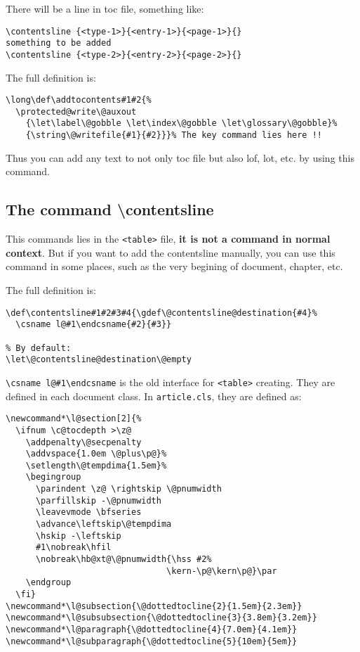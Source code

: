 \documentclass{article}
\begin{document}
There will be a line in toc file, something like:
\begin{lstlisting}
\contentsline {<type-1>}{<entry-1>}{<page-1>}{}
something to be added
\contentsline {<type-2>}{<entry-2>}{<page-2>}{}
\end{lstlisting}

The full definition is:
\begin{lstlisting}
\long\def\addtocontents#1#2{%
  \protected@write\@auxout
    {\let\label\@gobble \let\index\@gobble \let\glossary\@gobble}%
    {\string\@writefile{#1}{#2}}}% The key command lies here !!
\end{lstlisting}

Thus you can add any text to not only toc file but also lof, lot, etc. by using this command.

\subsection{The command \textbackslash contentsline}
This commands lies in the \verb|<table>| file, \textbf{it is not a command in normal context}. But if you want to add the 
contentsline manually, you can use this command in some places, such as the very begining of document, chapter, etc. 

The full definition is:
\begin{lstlisting}
\def\contentsline#1#2#3#4{\gdef\@contentsline@destination{#4}%
  \csname l@#1\endcsname{#2}{#3}}

% By default:
\let\@contentsline@destination\@empty
\end{lstlisting}

\verb|\csname l@#1\endcsname| is the old interface for \verb|<table>| creating. They are defined in each document class. In 
\verb|article.cls|, they are defined as:
\begin{lstlisting}
\newcommand*\l@section[2]{%
  \ifnum \c@tocdepth >\z@
    \addpenalty\@secpenalty
    \addvspace{1.0em \@plus\p@}%
    \setlength\@tempdima{1.5em}%
    \begingroup
      \parindent \z@ \rightskip \@pnumwidth
      \parfillskip -\@pnumwidth
      \leavevmode \bfseries
      \advance\leftskip\@tempdima
      \hskip -\leftskip
      #1\nobreak\hfil
      \nobreak\hb@xt@\@pnumwidth{\hss #2%
                                \kern-\p@\kern\p@}\par
    \endgroup
  \fi}
\newcommand*\l@subsection{\@dottedtocline{2}{1.5em}{2.3em}}
\newcommand*\l@subsubsection{\@dottedtocline{3}{3.8em}{3.2em}}
\newcommand*\l@paragraph{\@dottedtocline{4}{7.0em}{4.1em}}
\newcommand*\l@subparagraph{\@dottedtocline{5}{10em}{5em}}
\end{lstlisting}
\end{document}
